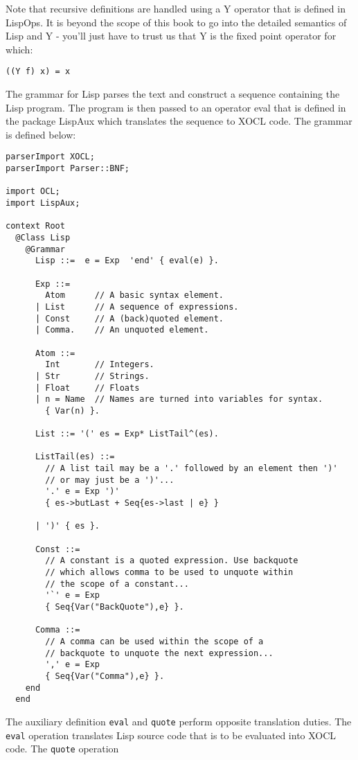 Note that recursive definitions are handled using a Y operator
that is defined in LispOps. It is beyond the scope of this book
to go into the detailed semantics of Lisp and Y - you'll just have
to trust us that Y is the fixed point operator for which:
\begin{lstlisting}
((Y f) x) = x
\end{lstlisting}
The grammar for Lisp parses the text and construct a sequence
containing the Lisp program. The program is then passed to an
operator eval that is defined in the package LispAux which
translates the sequence to XOCL code. The grammar is defined
below:
\begin{lstlisting}
parserImport XOCL;
parserImport Parser::BNF;
 
import OCL;
import LispAux;
 
context Root 
  @Class Lisp 
    @Grammar  
      Lisp ::=  e = Exp  'end' { eval(e) }.
        
      Exp ::= 
        Atom      // A basic syntax element.
      | List      // A sequence of expressions.
      | Const     // A (back)quoted element.
      | Comma.    // An unquoted element.
      
      Atom ::= 
        Int       // Integers.
      | Str       // Strings.
      | Float     // Floats
      | n = Name  // Names are turned into variables for syntax.
        { Var(n) }.
      
      List ::= '(' es = Exp* ListTail^(es).
        
      ListTail(es) ::=       
        // A list tail may be a '.' followed by an element then ')'
        // or may just be a ')'...        
        '.' e = Exp ')' 
        { es->butLast + Seq{es->last | e} }
        
      | ')' { es }.
      
      Const ::=        
        // A constant is a quoted expression. Use backquote
        // which allows comma to be used to unquote within
        // the scope of a constant...       
        '`' e = Exp 
        { Seq{Var("BackQuote"),e} }.
        
      Comma ::=        
        // A comma can be used within the scope of a
        // backquote to unquote the next expression...       
        ',' e = Exp 
        { Seq{Var("Comma"),e} }.        
    end
  end
\end{lstlisting}
The auxiliary definition {\tt eval} and {\tt quote} perform opposite
translation duties. The {\tt eval} operation translates Lisp source
code that is to be evaluated into XOCL code. The {\tt quote} operation
